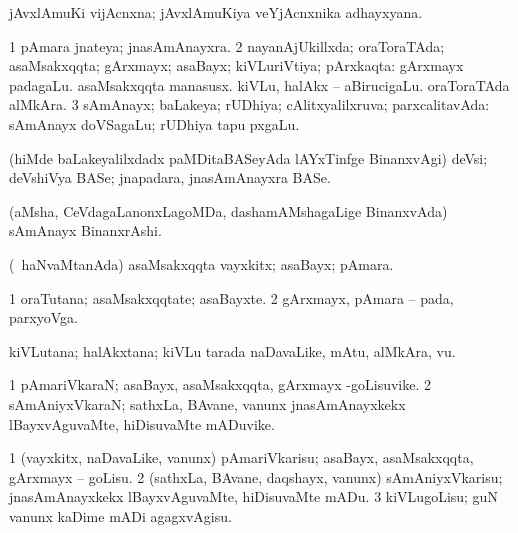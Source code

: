 {{{{{{{{{{{{{{\bentry
{} 
\gl{\nA}
\expl{}
\bmng
 jAvxlAmuKi vijAcnxna; jAvxlAmuKiya veYjAcnxnika adhayxyana. 
\emng
\eentry

\bentry
{} 
\gl{\gu}
\expl{}
\bmng
\bnum
\num{1} pAmara jnateya; jnasAmAnayxra. 
\num{2} nayanAjUkillxda; oraToraTAda; asaMsakxqqta; gArxmayx; asaBayx; kiVLuriVtiya; pArxkaqta:  gArxmayx padagaLu.  asaMsakxqqta manasusx.  kiVLu, halAkx -- aBirucigaLu.  oraToraTAda alMkAra. 
\num{3} sAmAnayx; baLakeya; rUDhiya; cAlitxyalilxruva; parxcalitavAda:  sAmAnayx doVSagaLu; rUDhiya tapu pxgaLu. 
\enum
\emng

\noindent 
\gl{\pagu}
\expl{}
\bmng
  (hiMde baLakeyalilxdadx paMDitaBASeyAda lAYxTinfge BinanxvAgi) deVsi; deVshiVya BASe; jnapadara, jnasAmAnayxra BASe. 
\emng
\eentry

\bentry
{}
\gl{\nA}
\expl{}
\bmng
 (aMsha, CeVdagaLanonxLagoMDa, dashamAMshagaLige BinanxvAda) sAmAnayx BinanxrAshi. 
\emng
\eentry

\bentry
{} 
\gl{\nA}
\expl{}
\bmng
 (\kanmu\ haNvaMtanAda) asaMsakxqqta vayxkitx; asaBayx; pAmara. 
\emng
\eentry

\bentry
{} 
\gl{\sakirx}
\expl{}
\bmng
\emng
\eentry

\bentry
{} 
\gl{\nA}
\expl{}
\bmng
\bnum
\num{1} oraTutana; asaMsakxqqtate; asaBayxte. 
\num{2} gArxmayx, pAmara -- pada, parxyoVga. 
\enum
\emng
\eentry

\bentry 
{} 
\gl{\nA}
\bmng
 kiVLutana; halAkxtana; kiVLu tarada naDavaLike, mAtu, alMkAra, \mo vu. 
\emng
\eentry

\bentry 
{} 
\gl{\nA}
\expl{}
\bmng
\bnum
\num{1} pAmariVkaraN; asaBayx, asaMsakxqqta, gArxmayx -goLisuvike. 
\num{2} sAmAniyxVkaraN; sathxLa, BAvane, \mo vanunx jnasAmAnayxkekx lBayxvAguvaMte, hiDisuvaMte mADuvike. 
\enum
\emng
\eentry

\bentry 
{} 
\gl{\sakirx}
\expl{}
\bmng
\bnum
\num{1} (vayxkitx, naDavaLike, \mo vanunx) pAmariVkarisu; asaBayx, asaMsakxqqta, gArxmayx -- goLisu. 
\num{2} (sathxLa, BAvane, daqshayx, \mo vanunx) sAmAniyxVkarisu; jnasAmAnayxkekx lBayxvAguvaMte, hiDisuvaMte mADu. 
\num{3} kiVLugoLisu; guN \mo vanunx kaDime mADi agagxvAgisu. 
\enum
\emng
\eentry

}}}}}}}}}}}}}}
